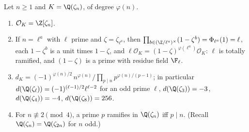 \begin{theorem}\label{thm:ant:cyclotomicintegers}
Let $n\ge1$ and $K=\Q(\zeta_n)$, of degree $\varphi(n)$.
\begin{enumerate}[label=(\roman*)]
\item $\mathcal O_K=\Z[\zeta_n]$.
\item If $n=\ell^a$ with $\ell$ prime and $\zeta=\zeta_{\ell^a}$, then $\prod_{b\in(\Z/\ell^a)^\times}(1-\zeta^b)=\Phi_{\ell^a}(1)=\ell$, each $1-\zeta^b$ is a unit times
$1-\zeta$, and $\ell\mathcal O_K=(1-\zeta)^{\varphi(\ell^a)}\mathcal O_K$: $\ell$ is totally ramified, and $(1-\zeta)$ is a prime with residue field $\F_\ell$.
\item $d_K=(-1)^{\varphi(n)/2}\,n^{\varphi(n)}\big/\prod_{p\mid n}p^{\varphi(n)/(p-1)}$; in particular $d(\Q(\zeta_\ell))=(-1)^{(\ell-1)/2}\ell^{\ell-2}$ for an odd prime
$\ell$, $d(\Q(\zeta_3))=-3$, $d(\Q(\zeta_4))=-4$, $d(\Q(\zeta_8))=256$.
\item For $n\not\equiv2\pmod4$, a prime $p$ ramifies in $\Q(\zeta_n)$ iff $p\mid n$. (Recall $\Q(\zeta_n)=\Q(\zeta_{2n})$ for $n$ odd.)
\end{enumerate}
\end{theorem}

